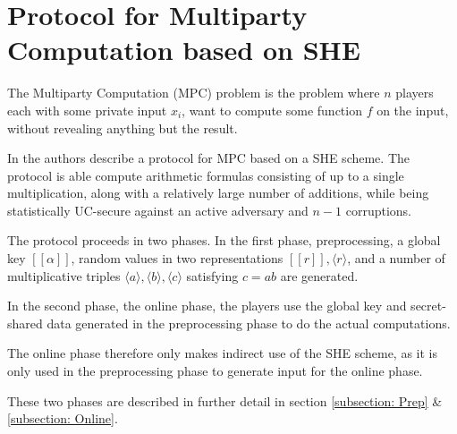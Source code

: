 \documentclass[../main.tex]{subfiles}
\begin{document}
\section{Protocol for Multiparty Computation based on SHE} \label{section: MPC scheme}
The Multiparty Computation (MPC) problem is the problem where $n$ players each with some private input $x_i$, want to compute some function $f$ on the input, without revealing anything but the result.

In \cite{damgaard2012multiparty} the authors describe a protocol for MPC based on a SHE scheme. The protocol is able compute arithmetic formulas consisting of up to a single multiplication, along with a relatively large number of additions, while being statistically UC-secure against an active adversary and $n - 1$ corruptions.

The protocol proceeds in two phases. In the first phase, preprocessing, a global key $[\![\alpha]\!]$, random values in two representations $[\![r]\!], \langle r \rangle$, and a number of multiplicative triples $\langle a \rangle, \langle b \rangle, \langle c \rangle$ satisfying $c = ab$ are generated.

In the second phase, the online phase, the players use the global key and secret-shared data generated in the preprocessing phase to do the actual computations.

The online phase therefore only makes indirect use of the SHE scheme, as it is only used in the preprocessing phase to generate input for the online phase.

These two phases are described in further detail in section \ref{subsection: Prep} \& \ref{subsection: Online}.
\end{document}
